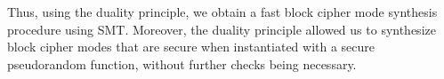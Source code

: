 \documentclass[preprint]{sig-alternate-05-2015}
\begin{document}


Thus, using the duality principle, we obtain a fast block cipher mode synthesis procedure using SMT.
Moreover, the duality principle allowed us to synthesize
block cipher modes that are 
secure when instantiated with a secure pseudorandom function,
without further checks being necessary.

\end{document}
